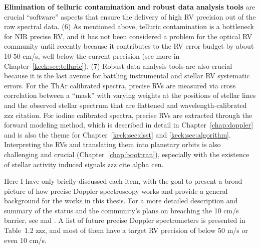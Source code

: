 {\bf Elimination of telluric contamination and robust data analysis
tools} are crucial ``software'' aspects that ensure the delivery of
high RV precision out of the raw spectral data. (6) As mentioned
above, telluric contamination is a bottleneck for NIR precise RV, and
it has not been considered a problem for the optical RV community
until recently because it contributes to the RV error budget by about
10-50 cm/s, well below the current precision (see more in
Chapter~\ref{keck:sec:telluric}). (7) Robust data analysis tools are
also crucial because it is the last avenue for battling instrumental
and stellar RV systematic errors. For the ThAr calibrated spectra,
precise RVs are measured via cross correlation between a ``mask'' with
varying weights at the positions of stellar lines and the observed
stellar spectrum that are flattened and wavelength-calibrated zzz
citation. For iodine calibrated spectra, precise RVs are extracted
through the forward modeling method, which is described in detail in
Chapter~\ref{chap:doppler} and is also the theme for
Chapter~\ref{keck:sec:dsst} and \ref{keck:sec:algorithm}. Interpreting
the RVs and translating them into planetary orbits is also challenging
and crucial (Chapter~\ref{chap:boottran}), especially with the
existence of stellar activity induced signals zzz cite alpha cen.

Here I have only briefly discussed each item, with the goal to present
a broad picture of how precise Doppler spectroscopy works and provide
a general background for the works in this thesis. For a more detailed
description and summary of the status and the community's plans on
breaching the 10 cm/s barrier, see \cite{exopag2015} and
\cite{eprv2015}. A list of future precise Doppler spectrometers is
presented in Table~1.2 zzz, and most of them have a target RV
precision of below 50 m/s or even 10 cm/s.


